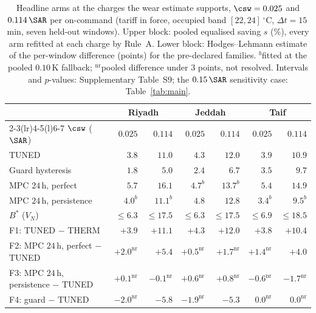 \begin{table}[t]
\centering
\caption{Headline arms at the charges the wear estimate supports, $\csw=0.025$ and $0.114\,\SAR$ per on-command (tariff in force, occupied band $[22,24]\,^\circ$C, $\Delta t=15\,$min, seven held-out windows). Upper block: pooled equalised saving $s$ (\%), every arm refitted at each charge by Rule~A. Lower block: Hodges--Lehmann estimate of the per-window difference (points) for the pre-declared families. $^{b}$fitted at the pooled $0.10\,$K fallback; $^{\mathrm{nr}}$pooled difference under $3$ points, not resolved. Intervals and $p$-values: Supplementary Table~S9; the $0.15\,\SAR$ sensitivity case: Table~\ref{tab:main}.}
\label{tab:derived}
\small
\begin{tabular*}{\textwidth}{@{\extracolsep{\fill}}lrrrrrr@{}}
\toprule
 & \multicolumn{2}{c}{Riyadh} & \multicolumn{2}{c}{Jeddah} & \multicolumn{2}{c}{Taif} \\
\cmidrule(lr){2-3}\cmidrule(lr){4-5}\cmidrule(l){6-7}
$\csw$ ($\SAR$) & $0.025$ & $0.114$ & $0.025$ & $0.114$ & $0.025$ & $0.114$ \\
\midrule
TUNED & $3.8$ & $11.0$ & $4.3$ & $12.0$ & $3.9$ & $10.9$ \\
Guard hysteresis & $1.8$ & $5.0$ & $2.4$ & $6.7$ & $3.5$ & $9.7$ \\
MPC $24\,$h, perfect & $5.7$ & $16.1$ & $4.7^{b}$ & $13.7^{b}$ & $5.4$ & $14.9$ \\
MPC $24\,$h, persistence & $4.0^{b}$ & $11.1^{b}$ & $4.8$ & $12.8$ & $3.4^{b}$ & $9.5^{b}$ \\
$B^{\ast}$ ($V_N$) & $\le6.3$ & $\le17.5$ & $\le6.3$ & $\le17.5$ & $\le6.9$ & $\le18.5$ \\
\midrule
F1: TUNED $-$ THERM & $+3.9$ & $+11.1$ & $+4.3$ & $+12.0$ & $+3.8$ & $+10.4$ \\
F2: MPC $24\,$h, perfect $-$ TUNED & $+2.0^{\mathrm{nr}}$ & $+5.4$ & $+0.5^{\mathrm{nr}}$ & $+1.7^{\mathrm{nr}}$ & $+1.4^{\mathrm{nr}}$ & $+4.0$ \\
F3: MPC $24\,$h, persistence $-$ TUNED & $+0.1^{\mathrm{nr}}$ & $-0.1^{\mathrm{nr}}$ & $+0.6^{\mathrm{nr}}$ & $+0.8^{\mathrm{nr}}$ & $-0.6^{\mathrm{nr}}$ & $-1.7^{\mathrm{nr}}$ \\
F4: guard $-$ TUNED & $-2.0^{\mathrm{nr}}$ & $-5.8$ & $-1.9^{\mathrm{nr}}$ & $-5.3$ & $0.0^{\mathrm{nr}}$ & $0.0^{\mathrm{nr}}$ \\
\bottomrule
\end{tabular*}
\end{table}
